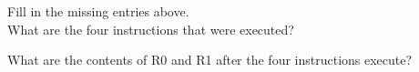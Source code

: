 \documentclass{patt}
\begin{document}
\begin{exercises}
\vspace{0.1in}
\noindent
Fill in the missing entries above. \\ 

\vspace{0.1in}
\noindent
What are the four instructions that were executed?

\vspace{0.1in}
\noindent
What are the contents of R0 and R1 after the four instructions execute? \\

\end{exercises}
\end{document}
